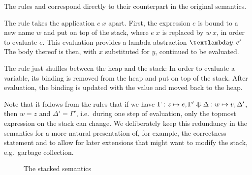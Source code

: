 \documentclass{jfp1}
\newtheorem{lemma}{Lemma}
\theoremstyle{nonumberbreak}
\newcommand{\sApp}[2]{#1\;#2}
\newcommand{\sLam}[2]{\text{\textlambda} #1.\, #2}
\newcommand{\sLet}[2]{\text{\textsf{let}}\ #1\ \text{\textsf{in}}\ #2}
\newcommand{\ssred}[4]{#1 : #2 \mathrel{\rotatebox[origin=c]{90}{$\Lleftarrow$}} #3 : #4}
\newcommand{\sRule}[1]{\text{{\textsc{#1}}}}
\newcommand{\dom}[1]{\text{dom}\;#1}
\newcommand{\xeng}{x_1 = e_1, \ldots, x_n = e_n}
\newcommand{\xen}{x_1\mapsto e_1, \ldots, x_n\mapsto e_n}
\begin{document}
The rules \sRule{Lam} and \sRule{Let} correspond directly to their counterpart in the original semantics.

The rule \sRule{App} takes the application $\sApp e x$ apart. First, the expression $e$ is bound to a new name $w$ and put on top of the stack, where $\sApp e x$ is replaced by $\sApp w x$, in order to evaluate $e$. This evaluation provides a lambda abstraction $\sLam y {e'}$ The body thereof is then, with $x$ substituted for $y$, continued to be evaluated.

The rule \sRule{Var} just shuffles between the heap and the stack: In order to evaluate a variable, its binding is removed from the heap and put on top of the stack. After evaluation, the binding is updated with the value and moved back to the heap.

Note that it follows from the rules that if we have $\ssred \Gamma {z \mapsto e, \Gamma'} {\Delta} {w \mapsto v, \Delta'}$, then $w = z$ and $\Delta' = \Gamma'$, i.e.~during one step of evaluation, only the topmost expression on the stack can change. We deliberately keep this redundancy in the semantics for a more natural presentation of, for example, the correctness statement and to allow for later extensions that might want to modify the stack, e.g.~garbage collection.



\begin{figure}
\caption{The stacked semantics}
\label{fig:stacksem}
\end{figure}
\end{document}
